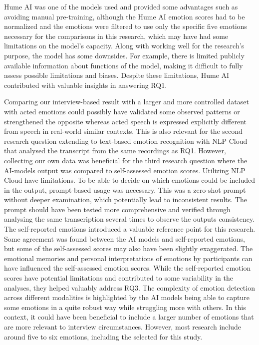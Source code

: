 Hume AI was one of the models used and provided some advantages such as avoiding manual
pre-training, although the Hume AI emotion scores had to be normalized and the emotions were filtered to use only the specific five emotions necessary for the comparisons in this research, which may have had some limitations on the model’s capacity. Along with
working well for the research’s purpose, the model has some downsides. For example, there is limited publicly available information about functions of the model, making it diﬀicult to fully assess possible limitations and biases. Despite these limitations, Hume AI contributed with valuable insights in answering RQ1.

\medskip
Comparing our interview-based result with a larger and more controlled dataset with acted emotions could possibly have validated some observed patterns or strengthened the opposite whereas acted speech is expressed explicitly different from speech in real-world similar contexts. This is also relevant for the second research question extending to text-based emotion recognition with NLP Cloud that analysed the transcript from the same recordings as RQ1. However, collecting our own data was beneficial for the third research question where the AI-models output was compared to self-assessed emotion scores. 
Utilizing NLP Cloud have limitations. To be able to decide on which emotions could be included in the output, prompt-based usage was necessary. This was a zero-shot prompt without deeper examination, which potentially lead to inconsistent results. The prompt should have been tested more comprehensive and verified through analysing the same transcription several times to observe the outputs consistency. 
The self-reported emotions introduced a valuable reference point for this research. Some agreement was found between the AI models and self-reported emotions, but some of the self-assessed scores may also have been slightly exaggerated. The emotional memories and personal interpretations of emotions by participants can have influenced the self-assessed emotion scores.
While the self-reported emotion scores have potential limitations and contributed to some variability in the analyses, they helped valuably address RQ3. The complexity of emotion detection across different modalities is highlighted by the AI models being able to capture some emotions in a quite robust way while struggling more with others. In this context, it could have been beneficial to include a larger number of emotions that are more relevant to interview circumstances. However, most research include around five to six emotions, including the selected for this study. 

